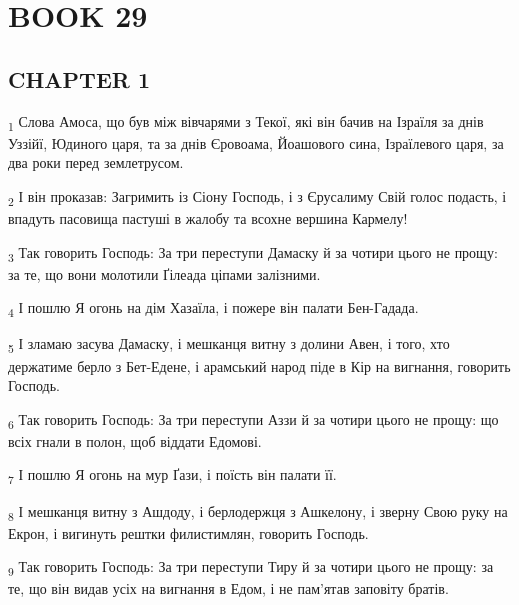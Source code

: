\section{BOOK 29}
\subsection{CHAPTER 1}
\begin{tcolorbox}
\textsubscript{1} Слова Амоса, що був між вівчарями з Текої, які він бачив на Ізраїля за днів Уззійї, Юдиного царя, та за днів Єровоама, Йоашового сина, Ізраїлевого царя, за два роки перед землетрусом.
\end{tcolorbox}
\begin{tcolorbox}
\textsubscript{2} І він проказав: Загримить із Сіону Господь, і з Єрусалиму Свій голос подасть, і впадуть пасовища пастуші в жалобу та всохне вершина Кармелу!
\end{tcolorbox}
\begin{tcolorbox}
\textsubscript{3} Так говорить Господь: За три переступи Дамаску й за чотири цього не прощу: за те, що вони молотили Ґілеада ціпами залізними.
\end{tcolorbox}
\begin{tcolorbox}
\textsubscript{4} І пошлю Я огонь на дім Хазаїла, і пожере він палати Бен-Гадада.
\end{tcolorbox}
\begin{tcolorbox}
\textsubscript{5} І зламаю засува Дамаску, і мешканця витну з долини Авен, і того, хто держатиме берло з Бет-Едене, і арамський народ піде в Кір на вигнання, говорить Господь.
\end{tcolorbox}
\begin{tcolorbox}
\textsubscript{6} Так говорить Господь: За три переступи Аззи й за чотири цього не прощу: що всіх гнали в полон, щоб віддати Едомові.
\end{tcolorbox}
\begin{tcolorbox}
\textsubscript{7} І пошлю Я огонь на мур Ґази, і поїсть він палати її.
\end{tcolorbox}
\begin{tcolorbox}
\textsubscript{8} І мешканця витну з Ашдоду, і берлодержця з Ашкелону, і зверну Свою руку на Екрон, і вигинуть рештки филистимлян, говорить Господь.
\end{tcolorbox}
\begin{tcolorbox}
\textsubscript{9} Так говорить Господь: За три переступи Тиру й за чотири цього не прощу: за те, що він видав усіх на вигнання в Едом, і не пам'ятав заповіту братів.
\end{tcolorbox}
